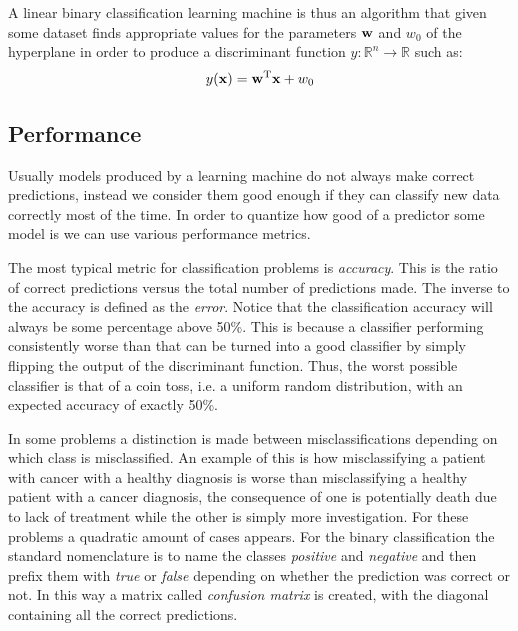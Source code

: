 A linear binary classification learning machine is thus an algorithm that given some dataset finds appropriate values for the parameters $\mathbf{w}$ and $w_0$ of the hyper\-plane in order to produce a discriminant function $y : \mathbb{R}^n \rightarrow \mathbb{R}$ such as:
\begin{align}
    y(\mathbf{x}) = \mathbf{w}^{\text{T}}\mathbf{x} + w_0
\end{align}

\subsection{Performance}

Usually models produced by a learning machine do not always make correct pre\-dict\-ions, instead we consider them good enough if they can classify new data correctly most of the time. In order to quantize how good of a predictor some model is we can use various performance metrics.

The most typical metric for classification problems is \emph{accuracy}. This is the ratio of correct predictions versus the total number of predictions made. The inverse to the accuracy is defined as the \emph{error}. Notice that the classification accuracy will always be some percentage above 50\%. This is because a classifier performing consistently worse than that can be turned into a good classifier by simply flipping the output of the discriminant function. Thus, the worst possible classifier is that of a coin toss, i.e. a uniform random distribution, with an expected accuracy of exactly 50\%.

In some problems a distinction is made between misclassifications depending on which class is misclassified. An example of this is how misclassifying a patient with cancer with a healthy diagnosis is worse than misclassifying a healthy patient with a cancer diagnosis, the consequence of one is potentially death due to lack of treatment while the other is simply more investigation. For these problems a quadratic amount of cases appears. For the binary classification the standard nomenclature is to name the classes \emph{positive} and \emph{negative} and then prefix them with \emph{true} or \emph{false} depending on whether the prediction was correct or not. In this way a matrix called \emph{confusion matrix} is created, with the diagonal containing all the correct predictions.

